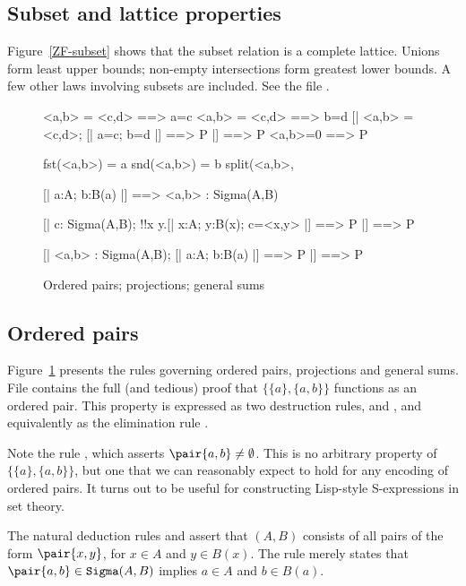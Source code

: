 \subsection{Subset and lattice properties}
Figure~\ref{ZF-subset} shows that the subset relation is a complete
lattice.  Unions form least upper bounds; non-empty intersections form
greatest lower bounds.  A few other laws involving subsets are included.
See the file .


\begin{figure}
\begin{ttbox}
    <a,b> = <c,d> ==> a=c
    <a,b> = <c,d> ==> b=d
     [| <a,b> = <c,d>;  [| a=c; b=d |] ==> P |] ==> P
      <a,b>=0 ==> P

       fst(<a,b>) = a
       snd(<a,b>) = b
     split(<a,b>, %

    [| a:A;  b:B(a) |] ==> <a,b> : Sigma(A,B)

    [| c: Sigma(A,B);  
             !!x y.[| x:A; y:B(x); c=<x,y> |] ==> P |] ==> P

   [| <a,b> : Sigma(A,B);    
             [| a:A;  b:B(a) |] ==> P   |] ==> P
\end{ttbox}
\caption{Ordered pairs; projections; general sums} \label{ZF-pair}
\end{figure}


\subsection{Ordered pairs}
Figure~\ref{ZF-pair} presents the rules governing ordered pairs,
projections and general sums.  File  contains the
full (and tedious) proof that $\{\{a\},\{a,b\}\}$ functions as an ordered
pair.  This property is expressed as two destruction rules,
 and , and equivalently
as the elimination rule .

Note the rule , which asserts
$\pair{a,b}\neq\emptyset$.  This is no arbitrary property of
$\{\{a\},\{a,b\}\}$, but one that we can reasonably expect to hold for any
encoding of ordered pairs.  It turns out to be useful for constructing
Lisp-style S-expressions in set theory.

The natural deduction rules  and 
assert that $(A,B)$ consists of all pairs of the form
$\pair{x,y}$, for $x\in A$ and $y\in B(x)$.  The rule 
merely states that $\pair{a,b}\in {\tt Sigma}(A,B)$ implies $a\in A$ and
$b\in B(a)$.


